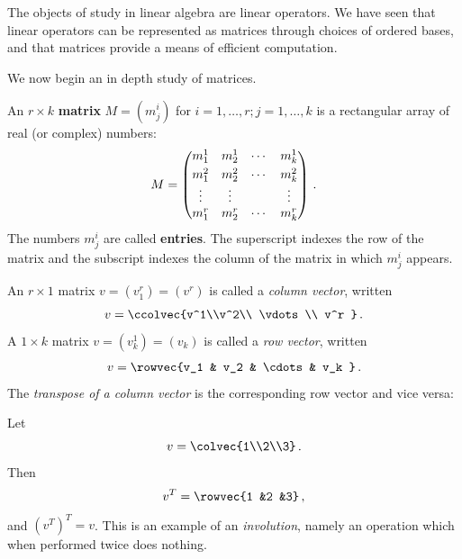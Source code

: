 


\section{\propMatricesTitle} \label{properties_matrices}

The objects of study in linear algebra are linear operators. 
We have seen that linear operators can be represented as matrices through choices of ordered bases, and that matrices provide a means of efficient computation. 

We now begin an in depth study of matrices.

\begin{definition}
An $r\times k$ {\bfseries matrix} $M=(m^i_j)$ for $i=1, \ldots, r; j=1, \ldots, k$ is a rectangular array of real (or complex) numbers:
\label{matrixnotation}
\[M = 
\begin{pmatrix}
m_1^1 & m_2^1 & \cdots & m_k^1 \\[1mm]
m_1^2 & m_2^2 & \cdots & m_k^2 \\
\multicolumn{1}{c}{\vdots} & \multicolumn{1}{c}{\vdots} &   & \multicolumn{1}{c}{\vdots} \\
m_1^r & m_2^r & \cdots & m_k^r \\
\end{pmatrix}\, .
\]
The numbers $m^i_j$ are called {\bfseries entries}.  The superscript indexes the row of the matrix and the subscript indexes the column of the matrix in which $m_j^i$ appears.
\end{definition}


An $r\times 1$ matrix $v = (v^r_1) = (v^r)$ is called a \emph{column vector}, written \[v = \ccolvec{v^1\\v^2\\ \vdots \\ v^r }\, .\]  A $1\times k$ matrix $v = (v^1_k) = (v_k)$ is called a \emph{row vector}, written \[v = \rowvec{v_1 & v_2 & \cdots & v_k }\, .\]  
The {\itshape transpose of a column vector} is the corresponding row vector and vice versa:

\begin{example}
Let 
\[
v=\colvec{1\\2\\3}\, .
\]
Then
\[
v^T=\rowvec{1 &2 &3}\, ,
\]
and $(v^T)^T=v$. This is an example of an {\itshape involution}, namely an operation which when performed twice does nothing.
\end{example}

